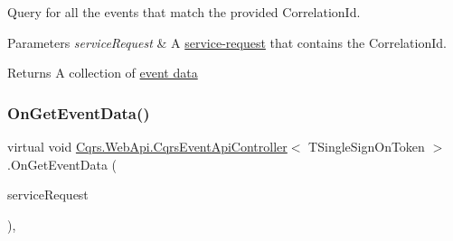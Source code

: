 Query for all the events that match the provided Correlation\+Id. 


\begin{DoxyParams}{Parameters}
{\em service\+Request} & A \hyperlink{}{service-\/request} that contains the Correlation\+Id.\\
\hline
\end{DoxyParams}
\begin{DoxyReturn}{Returns}
A collection of \hyperlink{}{event data}
\end{DoxyReturn}
\mbox{\label{classCqrs_1_1WebApi_1_1CqrsEventApiController_a705b40b973640de14f7b8b7b4c6eb1fe_a705b40b973640de14f7b8b7b4c6eb1fe}} 
\subsubsection{\texorpdfstring{On\+Get\+Event\+Data()}{OnGetEventData()}}
{\footnotesize\ttfamily virtual void \hyperlink{classCqrs_1_1WebApi_1_1CqrsEventApiController}{Cqrs.\+Web\+Api.\+Cqrs\+Event\+Api\+Controller}$<$ T\+Single\+Sign\+On\+Token $>$.On\+Get\+Event\+Data (\begin{DoxyParamCaption}\item[{\hyperlink{interfaceCqrs_1_1Services_1_1IServiceRequestWithData}{I\+Service\+Request\+With\+Data}$<$ T\+Single\+Sign\+On\+Token, Guid $>$}]{service\+Request }\end{DoxyParamCaption})\hspace{0.3cm}{\ttfamily [protected]}, {\ttfamily [virtual]}}

\mbox{\label{classCqrs_1_1WebApi_1_1CqrsEventApiController_a9f0147c846a7fd7628d199ff268d178e_a9f0147c846a7fd7628d199ff268d178e}} 

